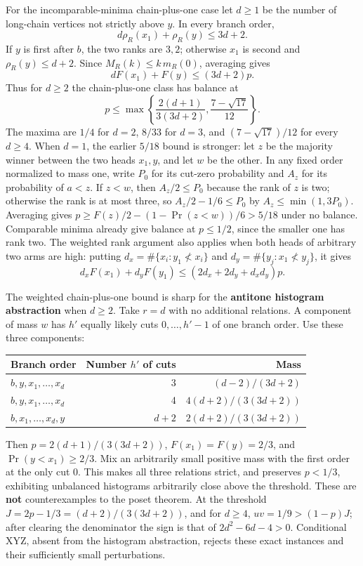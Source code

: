 \documentclass[11pt,letterpaper]{article}
\begin{document}
For the incomparable-minima chain-plus-one case let \(d\ge1\) be the
number of long-chain vertices not strictly above \(y\). In every branch
order, \[
   d\rho_R(x_1)+\rho_R(y)\le 3d+2.
\] If \(y\) is first after \(b\), the two ranks are \(3,2\); otherwise
\(x_1\) is second and \(\rho_R(y)\le d+2\). Since
\(M_R(k)\le k\,m_R(0)\), averaging gives \[
 d F(x_1)+F(y)\le (3d+2)p.
\] Thus for \(d\ge2\) the chain-plus-one class has balance at \[
 p\le\max\left\{
    \frac{2(d+1)}{3(3d+2)},\frac{7-\sqrt{17}}{12}
 \right\}.
\] The maxima are \(1/4\) for \(d=2\), \(8/33\) for \(d=3\), and
\((7-\sqrt{17})/12\) for every \(d\ge4\). When \(d=1\), the earlier
\(5/18\) bound is stronger: let \(z\) be the majority winner between the
two heads \(x_1,y\), and let \(w\) be the other. In any fixed order
normalized to mass one, write \(P_0\) for its cut-zero probability and
\(A_z\) for its probability of \(a<z\). If \(z<w\), then
\(A_z/2\le P_0\) because the rank of \(z\) is two; otherwise the rank is
at most three, so \(A_z/2-1/6\le P_0\) by \(A_z\le\min(1,3P_0)\).
Averaging gives \(p\ge F(z)/2-(1-\Pr(z<w))/6>5/18\) under no balance.
Comparable minima already give balance at \(p\le1/2\), since the smaller
one has rank two. The weighted rank argument also applies when both
heads of arbitrary two arms are high: putting
\(d_x=\#\{x_i:y_1\not<x_i\}\) and \(d_y=\#\{y_j:x_1\not<y_j\}\), it
gives \[
  d_xF(x_1)+d_yF(y_1)\le(2d_x+2d_y+d_xd_y)p.
\]

The weighted chain-plus-one bound is sharp for the \textbf{antitone
histogram abstraction} when \(d\ge2\). Take \(r=d\) with no additional
relations. A component of mass \(w\) has \(h'\) equally likely cuts
\(0,\ldots,h'-1\) of one branch order. Use these three components:

\begin{longtable}[]{@{}lrr@{}}
\toprule\noalign{}
Branch order & Number \(h'\) of cuts & Mass \\
\midrule\noalign{}
\endhead
\bottomrule\noalign{}
\endlastfoot
\(b,y,x_1,\ldots,x_d\) & 3 & \((d-2)/(3d+2)\) \\
\(b,y,x_1,\ldots,x_d\) & 4 & \(4(d+2)/(3(3d+2))\) \\
\(b,x_1,\ldots,x_d,y\) & \(d+2\) & \(2(d+2)/(3(3d+2))\) \\
\end{longtable}

Then \(p=2(d+1)/(3(3d+2))\), \(F(x_1)=F(y)=2/3\), and
\(\Pr(y<x_1)\ge2/3\). Mix an arbitrarily small positive mass with the
first order at the only cut 0. This makes all three relations strict,
and preserves \(p<1/3\), exhibiting unbalanced histograms arbitrarily
close above the threshold. These are \textbf{not} counterexamples to the
poset theorem. At the threshold \(J=2p-1/3=(d+2)/(3(3d+2))\), and for
\(d\ge4\), \(uv=1/9>(1-p)J\); after clearing the denominator the sign is
that of \(2d^2-6d-4>0\). Conditional XYZ, absent from the histogram
abstraction, rejects these exact instances and their sufficiently small
perturbations.
\end{document}
